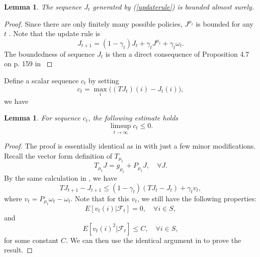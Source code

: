 \documentclass[12pt,a4paper]{amsart}
\numberwithin{equation}{section}
\theoremstyle{plain}
\newtheorem{Lemma}[Th]{Lemma}
\theoremstyle{definition}
\begin{document}
\begin{Lemma}\label{lmbounded}
	The sequence $J_t$ generated by (\ref{updaterule}) is bounded almost surely. 
\end{Lemma}
\begin{proof} Since there are only finitely many possible policies, $J^{\mu_t}$ is bounded for any $t$ . Note that the update rule is
$$
J_{t+1} = (1-\gamma_t) J_t + \gamma_t J^{\mu_t} +\gamma_t \omega_t.
$$
The boundedness of sequence $J_t$ is then a direct consequence of Proposition 4.7 on p. 159 in \cite{BertsekasTsitsiklis96}
\end{proof}

Define a scalar sequence $c_t$ by setting
\begin{equation} \label{dfct}
	c_t = \max_{i} \big((TJ_t)(i) - J_t(i)\big),
\end{equation}
we have 
\begin{Lemma} \label{lmct}
	For sequence $c_t$, the following estimate holds
	$$
	\limsup_{t \to \infty} c_t \leq 0.
	$$
\end{Lemma}
\begin{proof}
	The proof is essentially identical as in \cite{Ts03} with just a few minor modifications. Recall the vector form definition of $T_{\mu_t}$
	$$
	T_{\mu_t} J = g_{\mu_t} + P_{\mu_t} J, \quad \forall J.
	$$
	By the same calculation in \cite{Ts03}, we have 
	$$
	TJ_{t+1} - J_{t+1} \leq (1-\gamma_t) (TJ_t - J_t) + \gamma_t v_t,
	$$
	where $v_t = P_{\mu_t} \omega_t - \omega_t$. Note that for this $v_t$, we still have the following properties:
	$$
	E\left[ v_t(i) | \mathcal{F}_t \right] = 0, \quad  \forall i \in S,
	$$
	and 
	$$
	E\left[ v_t(i)^2 | \mathcal{F}_t \right]  \leq C, \quad \forall i \in S,
	$$
	for some constant $C$.  We can then use the identical argument in \cite{Ts03} to prove the result.
\end{proof}
\end{document}
